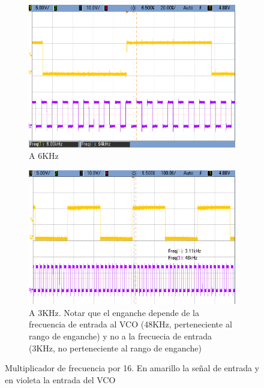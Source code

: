 \documentclass[../../tc_tp6_main.tex]{subfiles}
\begin{document}
\begin{figure}[H]	%
	\centering
	\begin{subfigure}[t]{0.45\textwidth}
		\centering
		\includegraphics[width=\textwidth]{figures/mult_16_6k.png}
		\caption{A 6KHz}
		\label{fig:mult_16_6k}
	\end{subfigure}%
	\hfill%
	\begin{subfigure}[t]{0.45\textwidth}
		\centering
		\includegraphics[width=\textwidth]{figures/mult_16_3k.png}
		\caption{A 3KHz. Notar que el enganche depende de la frecuencia de entrada al VCO (48KHz, perteneciente al rango de enganche) y no a la frecuecia de entrada (3KHz, no perteneciente al rango de enganche)}
		\label{fig:mult_16_3k}
	\end{subfigure}
	\caption{Multiplicador de frecuencia por 16. En amarillo la se\~nal de entrada y en violeta la entrada del VCO}
	\label{fig:mult_16}
\end{figure}
\end{document}
